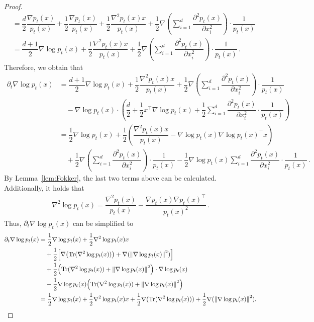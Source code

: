 \begin{proof}
\begin{align*}
    &=\dfrac{d}{2}\dfrac{\nabla p_t(x)}{p_t(x)}+\dfrac{1}{2}\dfrac{\nabla p_t(x)}{p_t(x)}+\dfrac{1}{2}\dfrac{\nabla^2 p_t(x)x}{p_t(x)}+\dfrac{1}{2}\nabla\left(\sum_{i=1}^d\dfrac{\partial^2 p_t(x)}{\partial x_i^2}\right)\cdot\dfrac{1}{p_t(x)}\\
    &=\dfrac{d+1}{2}\nabla\log p_t(x)+\dfrac{1}{2}\dfrac{\nabla^2 p_t(x)x}{p_t(x)}+\dfrac{1}{2}\nabla\left(\sum_{i=1}^d\dfrac{\partial^2 p_t(x)}{\partial x_i^2}\right)\cdot\dfrac{1}{p_t(x)}\,.
\end{align*}
Therefore, we obtain that
\begin{align*}
    \partial_t\nabla\log p_t(x)&=\dfrac{d+1}{2}\nabla\log p_t(x)+\dfrac{1}{2}\dfrac{\nabla^2 p_t(x)x}{p_t(x)}+\dfrac{1}{2}\nabla\left(\sum_{i=1}^d\dfrac{\partial^2 p_t(x)}{\partial x_i^2}\right)\cdot\dfrac{1}{p_t(x)}\\
    &\quad -\nabla\log p_t(x)\cdot\left(\dfrac{d}{2}+\dfrac{1}{2}x^\top\nabla\log p_t(x)+\dfrac{1}{2}\sum_{i=1}^d\dfrac{\partial^2p_t(x)}{\partial x_i^2}\cdot\dfrac{1}{p_t(x)}\right)\\
    &=\dfrac{1}{2}\nabla\log p_t(x)+\dfrac{1}{2}\left(\dfrac{\nabla^2p_t(x)x}{p_t(x)}-\nabla\log p_t(x)\nabla\log p_t(x)^\top x\right)\\
    &\quad +\dfrac{1}{2}\nabla\left(\sum_{i=1}^d\dfrac{\partial^2 p_t(x)}{\partial x_i^2}\right)\cdot\dfrac{1}{p_t(x)}-\dfrac{1}{2}\nabla\log p_t(x)\sum_{i=1}^d\dfrac{\partial^2p_t(x)}{\partial x_i^2}\cdot\dfrac{1}{p_t(x)}\,.
\end{align*}
By Lemma~\ref{lem:Fokker}, the last two terms above can be calculated. Additionally, it holds that
\begin{align*}
    \nabla^2\log p_t(x)=\dfrac{\nabla^2p_t(x)}{p_t(x)}-\dfrac{\nabla p_t(x)\nabla p_t(x)^\top}{p_t(x)^2}\,.
\end{align*}
Thus, $\partial_t\nabla\log p_t(x)$ can be simplified to
\begin{align*}
    \partial_t\nabla\log p_t(x)&=\dfrac{1}{2}\nabla\log p_t(x)+\dfrac{1}{2}\nabla^2\log p_t(x)x\\
    &\quad +\dfrac{1}{2}\left[\nabla\left(\Tr(\nabla^2\log p_t(x))\right)+\nabla(\l|\nabla\log p_t(x)\r|^2)\right]\\
    &\quad+\dfrac{1}{2}\left(\Tr(\nabla^2\log p_t(x))+\l|\nabla\log p_t(x)\r|^2\right)\cdot\nabla\log p_t(x)\\
    &\quad -\dfrac{1}{2}\nabla\log p_t(x)\left(\Tr(\nabla^2\log p_t(x))+\l|\nabla\log p_t(x)\r|^2\right)\\
    &=\dfrac{1}{2}\nabla\log p_t(x)+\dfrac{1}{2}\nabla^2\log p_t(x)x+\dfrac{1}{2}\nabla(\Tr(\nabla^2\log p_t(x)))+\dfrac{1}{2}\nabla(\l|\nabla\log p_t(x)\r|^2).

\end{align*}
\end{proof}

